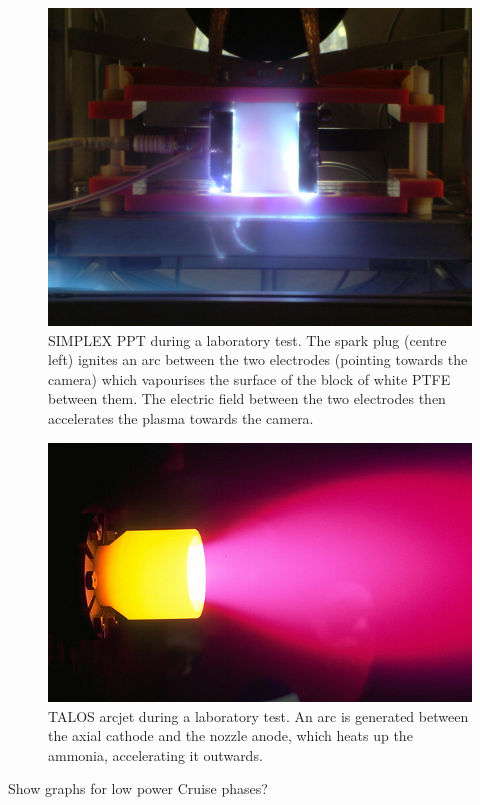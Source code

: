 \begin{figure}
\includegraphics[width=\textwidth]{Images/PPT_test.JPG}
\caption{SIMPLEX PPT during a laboratory test. The spark plug (centre left) ignites an arc between the two electrodes (pointing towards the camera) which vapourises the surface of the block of white PTFE between them. The electric field between the two electrodes then accelerates the plasma towards the camera.}\label{fig:PPT}
\end{figure}
\begin{figure}
\includegraphics[width=\textwidth]{Images/hiparc_betrieb.png}
\caption{TALOS arcjet during a laboratory test. An arc is generated between the axial cathode and the nozzle anode, which heats up the ammonia, accelerating it outwards.}\label{fig:arcjet}
\end{figure}
Show graphs for low power Cruise phases? 
